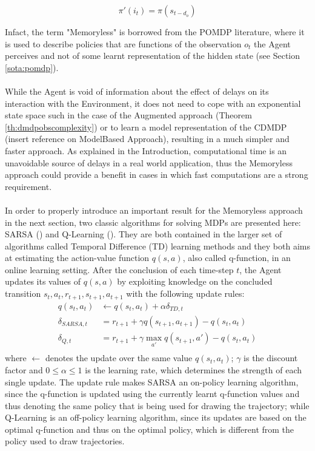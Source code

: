                 \[ \pi'(i_t) = \pi(s_{t-d_o}) \]
                
                Infact, the term "Memoryless" is borrowed from the POMDP literature, where it is used to describe policies that are functions of the observation $o_t$ the Agent perceives and not of some learnt representation of the hidden state (see Section \ref{sota:pomdp}).
                \\\\
                While the Agent is void of information about the effect of delays on its interaction with the Environment, it does not need to cope with an exponential state space such in the case of the Augmented approach (Theorem \ref{th:dmdpobscomplexity}) or to learn a model representation of the CDMDP (\color{red}insert reference on ModelBased Approach\color{black}), resulting in a much simpler and faster approach. As explained in the Introduction, computational time is an unavoidable source of delays in a real world application, thus the Memoryless approach could provide a benefit in cases in which fast computations are a strong requirement.
                \\\\
                In order to properly introduce an important result for the Memoryless approach in the next section, two classic algorithms for solving MDPs are presented here: SARSA () and Q-Learning (). They are both contained in the larger set of algorithms called Temporal Difference (TD) learning methods and they both aims at estimating the action-value function $q(s,a)$, also called q-function, in an online learning setting. After the conclusion of each time-step $t$, the Agent updates its values of $q(s,a)$ by exploiting knowledge on the concluded transition $s_t, a_t, r_{t+1}, s_{t+1}, a_{t+1}$ with the following update rules:
                \begin{align*}
                    q(s_t, a_t) &\leftarrow q(s_t, a_t) + \alpha \delta_{TD, t}\\
                    \delta_{SARSA, t}    &= r_{t+1} + \gamma q(s_{t+1}, a_{t+1}) - q(s_t, a_t)\\
                    \delta_{Q, t}        &= r_{t+1} + \gamma \max_{a'} q(s_{t+1}, a') - q(s_t, a_t)\\
                \end{align*}
                where $\leftarrow$ denotes the update over the same value $q(s_t, a_t)$; $\gamma$ is the discount factor and $0 \leq \alpha \leq 1$ is the learning rate, which determines the strength of each single update. The update rule makes SARSA an on-policy learning algorithm, since the q-function is updated using the currently learnt q-function values and thus denoting the same policy that is being used for drawing the trajectory; while Q-Learning is an off-policy learning algorithm, since its updates are based on the optimal q-function and thus on the optimal policy, which is different from the policy used to draw trajectories. \newline
